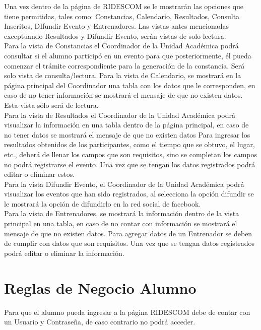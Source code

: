 \noindent Una vez dentro de la página de RIDESCOM se le mostrarán las opciones que tiene permitidas, tales como: Constancias, Calendario, Resultados, Consulta Inscritos, DIfundir Evento y Entrenadores. Las vistas antes mencionadas exceptuando Resultados y Difundir Evento, serán vistas de solo lectura.\\

\noindent Para la vista de Constancias el Coordinador de la Unidad Académica podrá consultar si el alumno participó en un evento para que posteriormente, él pueda comenzar el trámite correspondiente para la generación de la constancia. Será solo vista de consulta/lectura. Para la vista de Calendario, se mostrará en la página principal del Coordinador una tabla con los datos que le corresponden, en caso de no tener información se mostrará el mensaje de que no existen datos. Esta vista sólo será de lectura.\\

\noindent Para la vista de Resultados el Coordinador de la Unidad Académica podrá visualizar la información en una tabla dentro de la página principal, en caso de no tener datos se mostrará el mensaje de que no existen datos Para ingresar los resultados obtenidos de los participantes, como el tiempo que se obtuvo, el lugar, etc., deberá de llenar los campos que son requisitos, sino se completan los campos no podrá registrarse el evento. Una vez que se tengan los datos registrados podrá editar o eliminar estos.\\

\noindent Para la vista Difundir Evento, el Coordinador de la Unidad Académica podrá visualizar los eventos que han sido registrados, al selecciona la opción difundir se le mostrará la opción de difundirlo en la red social de facebook.\\

\noindent Para la vista de Entrenadores, se mostrará la información dentro de la vista principal en una tabla, en caso de no contar con información se mostrará el mensaje de que no existen datos. Para agregar datos de un Entrenador se deben de cumplir con datos que son requisitos. Una vez que se tengan datos registrados podrá editar o eliminar la información. \\

\section{Reglas de Negocio Alumno}
Para que el alumno pueda ingresar a la página RIDESCOM debe de contar con un Usuario y Contraseña, de caso contrario no podrá acceder.\\


